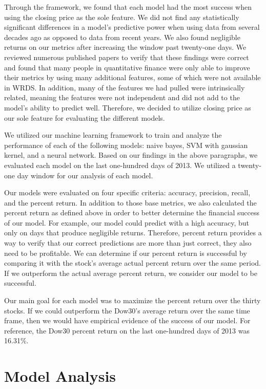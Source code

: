 \documentclass{article}
\begin{document}
Through the framework, we found that each model had the most success when using the closing price as the sole feature. We did not find any statistically significant differences in a model's predictive power when using data from several decades ago as opposed to data from recent years. We also found negligible returns on our metrics after increasing the window past twenty-one days. We reviewed numerous published papers to verify that these findings were correct and found that many people in quantitative finance were only able to improve their metrics by using many additional features, some of which were not available in WRDS. In addition, many of the features we had pulled were intrinsically related, meaning the features were not independent and did not add to the model's ability to predict well. Therefore, we decided to utilize closing price as our sole feature for evaluating the different models.

We utilized our machine learning framework to train and analyze the performance of each of the following models: naive bayes, SVM with gaussian kernel, and a neural network. Based on our findings in the above paragraphs, we evaluated each model on the last one-hundred days of 2013. We utilized a twenty-one day window for our analysis of each model.

Our models were evaluated on four specific criteria: accuracy, precision, recall, and the percent return. In addition to those base metrics, we also calculated the percent return as defined above in order to better determine the financial success of our model. For example, our model could predict with a high accuracy, but only on days that produce negligible returns. Therefore, percent return provides a way to verify that our correct predictions are more than just correct, they also need to be profitable. We can determine if our percent return is successful by comparing it with the stock's average actual percent return over the same period. If we outperform the actual average percent return, we consider our model to be successful.

Our main goal for each model was to maximize the percent return over the thirty stocks. If we could outperform the Dow30's average return over the same time frame, then we would have empirical evidence of the success of our model. For reference, the Dow30 percent return on the last one-hundred days of 2013 was 16.31\%.

\section{Model Analysis}
\end{document}
